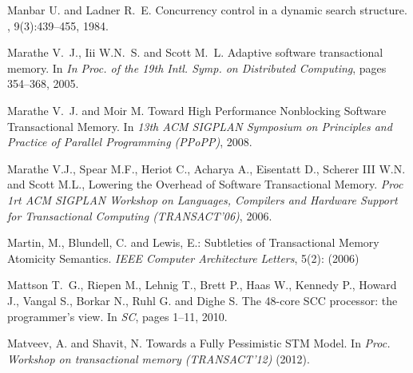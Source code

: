 \begin{thebibliography}{99}
{
Manbar U. and Ladner R.~E.
\newblock Concurrency control in a dynamic search structure.
, 9(3):439--455, 1984.






Marathe V.~J., Iii W.N.~S. and  Scott M.~L.
\newblock Adaptive software transactional memory.
\newblock In {\em In Proc. of the 19th Intl. Symp. on Distributed Computing},
  pages 354--368, 2005.

Marathe V.~J. and Moir M.
Toward High Performance Nonblocking Software Transactional Memory. 
In {\em 13th ACM SIGPLAN Symposium on Principles and Practice of Parallel Programming (PPoPP)}, 2008.


Marathe  V.J.,  Spear M.F., Heriot  C., Acharya A., Eisentatt  D., Scherer
III W.N. and Scott M.L.,
Lowering the Overhead of Software Transactional Memory. 
{\it  Proc 1rt  ACM SIGPLAN  Workshop on  Languages, Compilers  and Hardware
Support for Transactional Computing (TRANSACT'06)}, 2006. 





 Martin, M.,  Blundell, C. and Lewis, E.:
 Subtleties of Transactional Memory Atomicity Semantics. 
{\it IEEE Computer Architecture  Letters},  5(2):  (2006)



Mattson T.~G., Riepen M., Lehnig T., Brett P., Haas W., Kennedy P., Howard J.,
  Vangal S., Borkar N., Ruhl G. and Dighe S.
\newblock The 48-core {SCC} processor: the programmer's view.
\newblock In {\em SC}, pages 1--11, 2010.


Matveev, A. and  Shavit, N.
Towards a Fully Pessimistic STM Model. 
In {\it Proc. Workshop on transactional memory (TRANSACT'12)} (2012).



}
\end{thebibliography}
